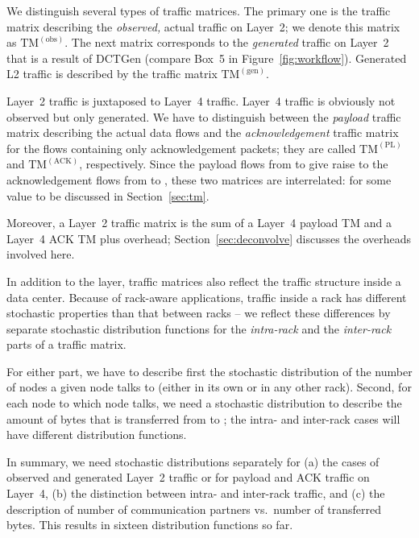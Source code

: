 \documentclass[journal,10pt]{IEEEtran}
\newcommand{\genname}{DCTGen}
\newcommand{\lt}{Layer~2}
\newcommand{\lf}{Layer~4}
\newcommand{\obstm}{\ensuremath{\mathrm{TM}^{(\mathrm{obs})}}}
\newcommand{\gentm}{\ensuremath{\mathrm{TM}^{(\mathrm{gen})}}}
\newcommand{\pltm}{\ensuremath{\mathrm{TM}^{(\mathrm{PL})}}}
\newcommand{\acktm}{\ensuremath{\mathrm{TM}^{(\mathrm{ACK})}}}
\begin{document}
We distinguish several types of traffic matrices. The primary one is the traffic matrix describing the \emph{observed,} actual traffic on Layer~2; we denote this matrix as \obstm. The next matrix corresponds to the \emph{generated} traffic on Layer~2 that is a result of \genname{} (compare Box~5 in Figure~\ref{fig:workflow}). Generated L2 traffic is described by the traffic matrix \gentm. 

\lt{} traffic is juxtaposed to \lf{} traffic. \lf{} traffic is obviously not observed but only generated. We have to distinguish between the \emph{payload} traffic matrix describing the actual data flows and the \emph{acknowledgement} traffic matrix for the flows containing only acknowledgement packets; they are called \pltm{} and \acktm, respectively. Since the payload flows from  to  give raise to the acknowledgement flows from  to , these two matrices are interrelated: 
 \noindent for some value  to be discussed in Section~\ref{sec:tm}. 

Moreover, a \lt{} traffic matrix is the sum of a \lf{} payload TM and a \lf{} ACK TM plus overhead; Section~\ref{sec:deconvolve} discusses the overheads involved here. 



In addition to the layer, traffic matrices also reflect the traffic structure inside a data center. 
Because of rack-aware applications, traffic inside a rack has different stochastic properties than that between racks -- we reflect these differences by separate stochastic distribution functions for the \emph{intra-rack} and the \emph{inter-rack} parts of a traffic matrix. 

For either part, we have to describe first the stochastic distribution of the number of nodes a given node  talks to (either in its own or in any other rack). Second, for each node   to which node  talks, we need a stochastic distribution to describe the amount of bytes that is transferred from  to ; the intra- and inter-rack cases will have different distribution functions. 

In summary, we need stochastic distributions separately for (a)  the cases of observed and generated \lt{} traffic or for payload and ACK traffic on \lf{}, (b) the distinction between intra- and inter-rack traffic, and (c) the description of number of communication partners vs.\ number of transferred bytes. This results in sixteen distribution functions so far. 
\end{document}

